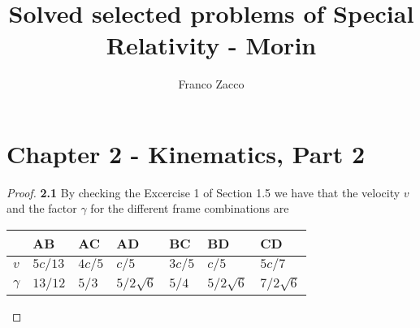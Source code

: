 \documentclass[11pt]{article}
\title{\textbf{Solved selected problems of Special Relativity - Morin}}
\author{Franco Zacco}
\date{}
\theoremstyle{definition}
\begin{document}
\maketitle
\thispagestyle{empty}

\section*{Chapter 2 - Kinematics, Part 2}

	\begin{proof}{\textbf{2.1}}
        By checking the Excercise 1 of Section 1.5 we have that the velocity $v$ and
        the factor $\gamma$ for the different frame combinations are
        \begin{table}[h]
            \centering
            \begin{tabular}{lllllll}
            \hline
                     & AB      & AC     & AD            & BC     & BD            & CD            \\ \hline
            $v$      & $5c/13$ & $4c/5$ & $c/5$         & $3c/5$ & $c/5$         & $5c/7$        \\
            $\gamma$ & $13/12$ & $5/3$  & $5/2\sqrt{6}$ & $5/4$  & $5/2\sqrt{6}$ & $7/2\sqrt{6}$ \\
            \end{tabular}
        \end{table}


\end{proof}
\end{document}
